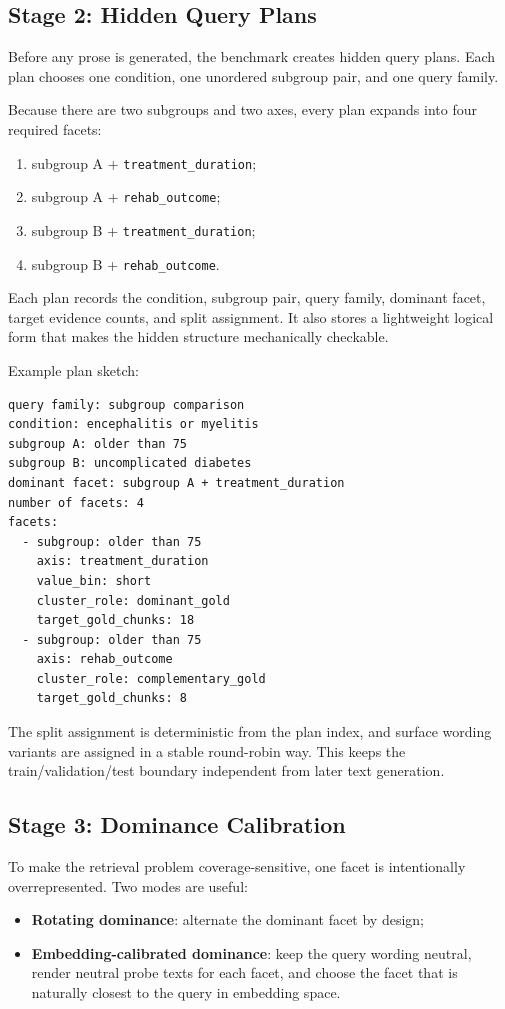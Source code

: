 \documentclass[11pt,a4paper]{article}
\newcommand{\field}[1]{\texttt{#1}}
\newcommand{\stage}[2]{\subsection{\textcolor{betterblue}{#1}: #2}}
\begin{document}
\stage{Stage 2}{Hidden Query Plans}

Before any prose is generated, the benchmark creates hidden query plans. Each plan chooses one condition, one unordered subgroup pair, and one query family.

Because there are two subgroups and two axes, every plan expands into four required facets:

\begin{enumerate}[noitemsep, topsep=0pt]
	\item subgroup A + \field{treatment\_duration};
	\item subgroup A + \field{rehab\_outcome};
	\item subgroup B + \field{treatment\_duration};
	\item subgroup B + \field{rehab\_outcome}.
\end{enumerate}

Each plan records the condition, subgroup pair, query family, dominant facet, target evidence counts, and split assignment. It also stores a lightweight logical form that makes the hidden structure mechanically checkable.

Example plan sketch:

\begin{lstlisting}[style=promptstyle]
query family: subgroup comparison
condition: encephalitis or myelitis
subgroup A: older than 75
subgroup B: uncomplicated diabetes
dominant facet: subgroup A + treatment_duration
number of facets: 4
facets:
  - subgroup: older than 75
    axis: treatment_duration
    value_bin: short
    cluster_role: dominant_gold
    target_gold_chunks: 18
  - subgroup: older than 75
    axis: rehab_outcome
    cluster_role: complementary_gold
    target_gold_chunks: 8
\end{lstlisting}

The split assignment is deterministic from the plan index, and surface wording variants are assigned in a stable round-robin way. This keeps the train/validation/test boundary independent from later text generation.

\stage{Stage 3}{Dominance Calibration}

To make the retrieval problem coverage-sensitive, one facet is intentionally overrepresented. Two modes are useful:

\begin{itemize}[noitemsep, topsep=0pt]
	\item \textbf{Rotating dominance}: alternate the dominant facet by design;
	\item \textbf{Embedding-calibrated dominance}: keep the query wording neutral, render neutral probe texts for each facet, and choose the facet that is naturally closest to the query in embedding space.
\end{itemize}
\end{document}
